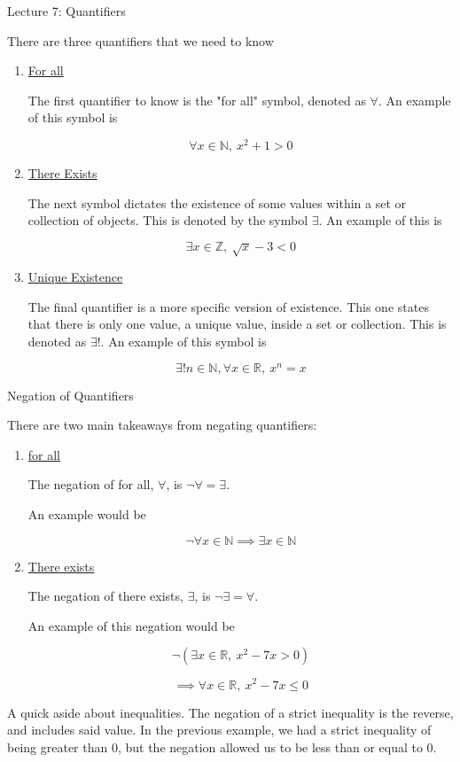 \documentclass[11pt]{amsart}
\newcommand{\R}{\mathbb{R}}
\newcommand{\N}{\mathbb{N}}
\newcommand{\Z}{\mathbb{Z}}
\begin{document}
\begin{section}{Lecture 7: Quantifiers}

There are three quantifiers that we need to know

\begin{enumerate}
	\item \underline{For all}
	
	The first quantifier to know is the "for all" symbol, denoted as $\forall$. An example of this symbol is 
	
	\[
		\forall x \in \N, \ x^2 + 1 > 0
	\]
	
	\item \underline{There Exists}
	
	The next symbol dictates the existence of some values within a set or collection of objects. This is denoted by the symbol $\exists$. An example of this is 
	
	\[
		\exists x \in \Z, \ \sqrt{x} - 3 < 0
	\]
	
	\item \underline{Unique Existence}
	
	The final quantifier is a more specific version of existence. This one states that there is only one value, a unique value, inside a set or collection. This is denoted as $\exists !$. An example of this symbol is 
	
	\[
		\exists! n \in \N, \forall x \in \R, \ x^n = x
	\]
\end{enumerate}

\end{section}

\begin{section}{Negation of Quantifiers}


	There are two main takeaways from negating quantifiers: 
	
	\begin{enumerate}
		
		\item \underline{for all}
		
		The negation of for all, $\forall$, is $\neg \forall = \exists$.
		
		An example would be 
		
		\[
		\neg \forall x \in \N \implies \exists x \in \N
		\]
		
		\item \underline{There exists}
		
		The negation of there exists, $\exists$, is $\neg \exists = \forall $.
		
		An example of this negation would be 
		
		\[
			\neg ( \exists x \in \R, \ x^2 - 7x > 0)
		\]
		
		\[
			\implies \forall x \in \R, \ x^2 - 7x \leq 0
		\]
		
	\end{enumerate}
	
	A quick aside about inequalities. The negation of a strict inequality is the reverse, and includes said value. In the previous example, we had a strict inequality of being greater than 0, but the negation allowed us to be less than or equal to 0.
\end{section}
\end{document}
